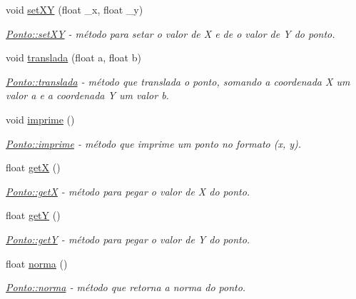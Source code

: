 \begin{DoxyCompactItemize}
void \hyperlink{classPonto_a827488219a7da184d440f687cec49ce6}{set\+XY} (float \+\_\+x, float \+\_\+y)
\begin{DoxyCompactList}\small\item\em \hyperlink{classPonto_a827488219a7da184d440f687cec49ce6}{Ponto\+::set\+XY} -\/ método para setar o valor de X e de o valor de Y do ponto. \end{DoxyCompactList}\item 
void \hyperlink{classPonto_a96a4395204ec010814e67d20705e630f}{translada} (float a, float b)
\begin{DoxyCompactList}\small\item\em \hyperlink{classPonto_a96a4395204ec010814e67d20705e630f}{Ponto\+::translada} -\/ método que translada o ponto, somando a coordenada X um valor a e a coordenada Y um valor b. \end{DoxyCompactList}\item 
\mbox{\label{classPonto_a84758d453e38f237bdf860b6435e9def}} 
void \hyperlink{classPonto_a84758d453e38f237bdf860b6435e9def}{imprime} ()
\begin{DoxyCompactList}\small\item\em \hyperlink{classPonto_a84758d453e38f237bdf860b6435e9def}{Ponto\+::imprime} -\/ método que imprime um ponto no formato (x, y). \end{DoxyCompactList}\item 
float \hyperlink{classPonto_ae4823d6ee26ff3448ee403d26a3c6d2f}{getX} ()
\begin{DoxyCompactList}\small\item\em \hyperlink{classPonto_ae4823d6ee26ff3448ee403d26a3c6d2f}{Ponto\+::getX} -\/ método para pegar o valor de X do ponto. \end{DoxyCompactList}\item 
float \hyperlink{classPonto_ab120600953e6544301223b9b05a43ee5}{getY} ()
\begin{DoxyCompactList}\small\item\em \hyperlink{classPonto_ab120600953e6544301223b9b05a43ee5}{Ponto\+::getY} -\/ método para pegar o valor de Y do ponto. \end{DoxyCompactList}\item 
float \hyperlink{classPonto_a9b0ddbdddd05edbc4d45ef0671a628c6}{norma} ()
\begin{DoxyCompactList}\small\item\em \hyperlink{classPonto_a9b0ddbdddd05edbc4d45ef0671a628c6}{Ponto\+::norma} -\/ método que retorna a norma do ponto. \end{DoxyCompactList}\item 

\end{DoxyCompactItemize}
